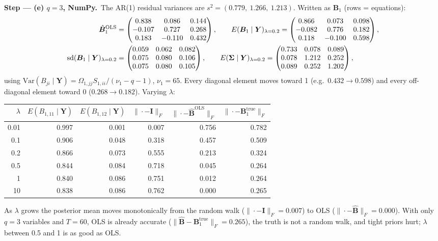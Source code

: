 \documentclass[11pt,a4paper]{article}
\newcommand{\passo}[2]{\par\smallskip\noindent\textbf{Step --- #1.}~#2}
\begin{document}
\begin{sol}
\passo{(e) $q=3$, NumPy}{The AR(1) residual variances are $s^2=(0.779,\ 1.266,\ 1.213)$. Written as $\bm B_1$ (rows = equations):
\begin{align}
\hat{\bm B}_1^{\mathrm{OLS}}&=\begin{pmatrix}0.838&0.086&0.144\\-0.107&0.727&0.268\\0.183&-0.110&0.432\end{pmatrix},\qquad
E(\bm B_1\mid\bm Y)_{\lambda=0.2}=\begin{pmatrix}0.866&0.073&0.098\\-0.082&0.776&0.182\\0.118&-0.100&0.598\end{pmatrix},\nonumber\\
\mathrm{sd}(\bm B_1\mid\bm Y)_{\lambda=0.2}&=\begin{pmatrix}0.059&0.062&0.082\\0.075&0.080&0.106\\0.075&0.080&0.105\end{pmatrix},\qquad
E(\bm{\Sigma}\mid\bm Y)_{\lambda=0.2}=\begin{pmatrix}0.733&0.078&0.089\\0.078&1.212&0.252\\0.089&0.252&1.202\end{pmatrix},\nonumber
\end{align}
using $\mathrm{Var}(B_{ji}\mid\bm Y)=\Omega_{1,jj}S_{1,ii}/(\nu_1-q-1)$, $\nu_1=65$. Every diagonal element moves toward 1 (e.g.\
$0.432\to0.598$) and every off-diagonal element toward 0 ($0.268\to0.182$). Varying $\lambda$:}
\begin{center}\small
\begin{tabular}{rrrrrr}
\toprule
$\lambda$ & $E(B_{1,11}\mid\bm Y)$ & $E(B_{1,12}\mid\bm Y)$ & $\|\cdot-\bm I\|_F$ & $\|\cdot-\hat{\bm B}^{\mathrm{OLS}}\|_F$ & $\|\cdot-\bm B_1^{\mathrm{true}}\|_F$\\
\midrule
0.01 & 0.997 & 0.001 & 0.007 & 0.756 & 0.782\\
0.1 & 0.906 & 0.048 & 0.318 & 0.457 & 0.509\\
0.2 & 0.866 & 0.073 & 0.555 & 0.213 & 0.324\\
0.5 & 0.844 & 0.084 & 0.718 & 0.045 & 0.264\\
1 & 0.840 & 0.086 & 0.751 & 0.012 & 0.264\\
10 & 0.838 & 0.086 & 0.762 & 0.000 & 0.265\\
\bottomrule
\end{tabular}
\end{center}
As $\lambda$ grows the posterior mean moves monotonically from the random walk ($\|\cdot-\bm I\|_F=0.007$) to OLS
($\|\cdot-\hat{\bm B}\|_F=0.000$). With only $q=3$ variables and $T=60$, OLS is already accurate
($\|\hat{\bm B}-\bm B_1^{\mathrm{true}}\|_F=0.265$), the truth is not a random walk, and tight priors hurt; $\lambda$ between
0.5 and 1 is as good as OLS.


\end{sol}
\end{document}
